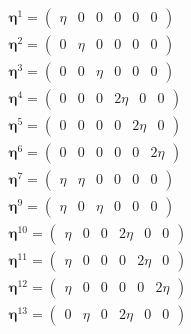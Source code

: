 \documentclass[showpacs,aps,floatfix,prb,reprint,superscriptaddress,onecolumn]{revtex4-1}
\begin{document}
\begin{subequations}
\label{eqn:strainstates} 
\begin{align}
        \bm{\eta}^1 =\left(\begin{matrix} \eta & 0 & 0 & 0 & 0 & 0 \end{matrix}\right)\\
	\bm{\eta}^2 =\left(\begin{matrix} 0 & \eta & 0 & 0 & 0 & 0 \end{matrix}\right)\\
	\bm{\eta}^3 =\left(\begin{matrix} 0 & 0 & \eta & 0 & 0 & 0 \end{matrix}\right)\\
    	\bm{\eta}^4 =\left(\begin{matrix} 0 & 0 & 0 & 2\eta & 0 & 0 \end{matrix}\right)\\
    	\bm{\eta}^5 =\left(\begin{matrix} 0 & 0 & 0 & 0 & 2\eta & 0 \end{matrix}\right)\\
    	\bm{\eta}^6 =\left(\begin{matrix} 0 & 0 & 0 & 0 & 0 & 2\eta \end{matrix}\right)\\
    	\bm{\eta}^7 =\left(\begin{matrix} \eta & \eta & 0 & 0 & 0 & 0 \end{matrix}\right)\\
    	\bm{\eta}^9 =\left(\begin{matrix} \eta & 0 & \eta & 0 & 0 & 0 \end{matrix}\right)\\
    	\bm{\eta}^{10} =\left(\begin{matrix} \eta & 0 & 0 & 2\eta & 0 & 0 \end{matrix}\right)\\
    	\bm{\eta}^{11} =\left(\begin{matrix} \eta & 0 & 0 & 0 & 2\eta & 0 \end{matrix}\right)\\
    	\bm{\eta}^{12} =\left(\begin{matrix} \eta & 0 & 0 & 0 & 0 & 2\eta \end{matrix}\right)\\
    	\bm{\eta}^{13} =\left(\begin{matrix} 0 & \eta & 0 & 2\eta & 0 & 0 \end{matrix}\right)\\

\end{align}
\end{subequations}
\end{document}
